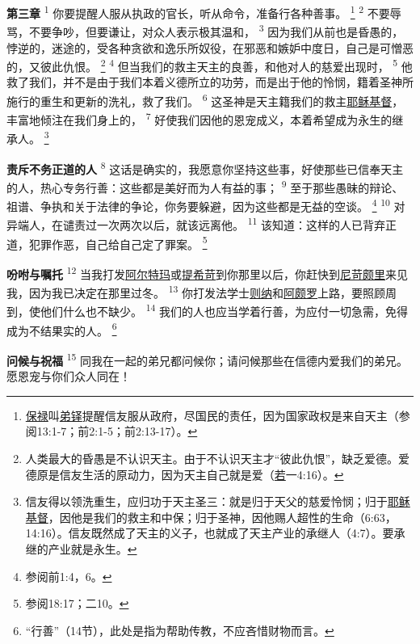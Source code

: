 \begin{multicols}{2}
\textbf{第三章\quad}
\textsuperscript{1}
你要提醒人服从执政的官长，听从命令，准备行各种善事。
\footnote{\uline{保禄}叫\uline{弟铎}提醒信友服从政府，尽国民的责任，因为国家政权是来自天主（参阅13:1-7；前2:1-5；前2:13-17）。}
\textsuperscript{2}
不要辱骂，不要争吵，但要谦让，对众人表示极其温和，
\textsuperscript{3}
因为我们从前也是昏愚的，悖逆的，迷途的，受各种贪欲和逸乐所奴役，在邪恶和嫉妒中度日，自己是可憎恶的，又彼此仇恨。
\footnote{人类最大的昏愚是不认识天主。由于不认识天主才“彼此仇恨”，缺乏爱德。爱德原是信友生活的原动力，因为天主自己就是爱（\uline{若}一4:16）。}
\textsuperscript{4}
但当我们的救主天主的良善，和他对人的慈爱出现时，
\textsuperscript{5}
他救了我们，并不是由于我们本着义德所立的功劳，而是出于他的怜悯，籍着圣神所施行的重生和更新的洗礼，救了我们。
\textsuperscript{6}
这圣神是天主籍我们的救主\uline{耶稣}\uline{基督}，丰富地倾注在我们身上的，
\textsuperscript{7}
好使我们因他的恩宠成义，本着希望成为永生的继承人。
\footnote{信友得以领洗重生，应归功于天主圣三：就是归于天父的慈爱怜悯；归于\uline{耶稣}\uline{基督}，因他是我们的救主和中保；归于圣神，因他赐人超性的生命（6:63，14:16）。信友既然成了天主的义子，也就成了天主产业的承继人（4:7）。要承继的产业就是永生。}

\textbf{责斥不务正道的人\quad}
\textsuperscript{8}
这话是确实的，我愿意你坚持这些事，好使那些已信奉天主的人，热心专务行善：这些都是美好而为人有益的事；
\textsuperscript{9}
至于那些愚昧的辩论、祖谱、争执和关于法律的争论，你务要躲避，因为这些都是无益的空谈。
\footnote{参阅前1:4，6。}
\textsuperscript{10}
对异端人，在谴责过一次两次以后，就该远离他。
\textsuperscript{11}
该知道：这样的人已背弃正道，犯罪作恶，自己给自己定了罪案。
\footnote{参阅18:17；二10。}

\textbf{吩咐与嘱托\quad}
\textsuperscript{12}
当我打发\uline{阿尔特玛}或\uline{提希苛}到你那里以后，你赶快到\uline{尼苛颇里}来见我，因为我已决定在那里过冬。
\textsuperscript{13}
你打发法学士\uline{则纳}和\uline{阿颇罗}上路，要照顾周到，使他们什么也不缺少。
\textsuperscript{14}
我们的人也应当学着行善，为应付一切急需，免得成为不结果实的人。
\footnote{“行善”（14节），此处是指为帮助传教，不应吝惜财物而言。}

\textbf{问候与祝福\quad}
\textsuperscript{15}
同我在一起的弟兄都问候你；请问候那些在信德内爱我们的弟兄。愿恩宠与你们众人同在！
\end{multicols}